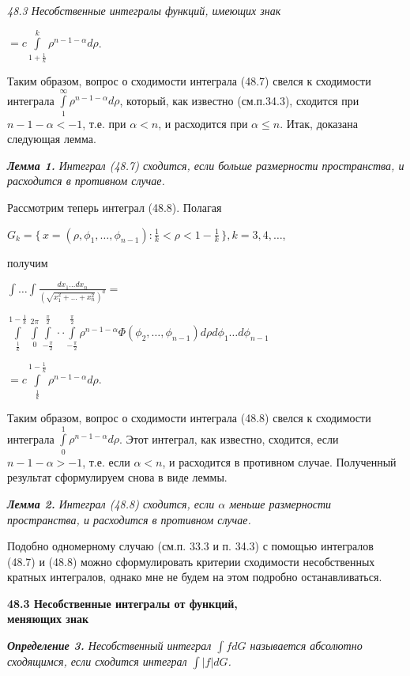 ﻿\documentclass[twocolumn,a4paper]{article}
\begin{document}
\newpage

{\slshape{48.3 Несобственные интегралы функций, имеющих знак}}
\begin{center}
$= c \int\limits^k_{1 + \frac1k} \rho^{n-1-\alpha}d\rho$.
\end{center}
Таким образом, вопрос о сходимости интеграла (48.7) свелся к сходимости интеграла $\int\limits_1^{\infty}\rho^{n-1-\alpha}d\rho$, который, как известно (см.п.34.3), сходится при $n - 1 - \alpha < -1$, т.е. при $\alpha < n$, и расходится при $\alpha\le n$. Итак, доказана следующая лемма.

{\slshape{{\bfseries{Лемма 1.}} Интеграл (48.7) сходится, если %
больше размерности пространства, и расходится в противном случае.}}

Рассмотрим теперь интеграл (48.8). Полагая
\begin{center}
$G_k = \{\,x = (\rho,\phi_1,\ldots,\phi_{n-1}):\frac1k < \rho < 1 - \frac1k\,\}, k = 3,4,\ldots$,
\end{center}
получим
\begin{center}
$\int \ldots \int\frac{dx_1\ldots dx_n}{(\sqrt{x^2_1+\ldots +x^2_n})^a} = $
\end{center}
\begin{center}
$\int\limits^{1-\frac1k}_{\frac1k}\int\limits_0^{2\pi}\int\limits_{-\frac{\pi}{2}}^{\frac{\pi}{2}}\cdot \cdot \int\limits_{-\frac{\pi}{2}}^{\frac{\pi}{2}}\rho^{n-1-\alpha}\Phi(\phi_2,\ldots,\phi_{n-1})d\rho d\phi_1\ldots d\phi_{n-1}$
\end{center}
\begin{center}
$= c \int\limits^{1-\frac1k}_{\frac1k} \rho^{n-1-\alpha}d\rho$.
\end{center}
Таким образом, вопрос о сходимости интеграла (48.8) свелся к сходимости интеграла $\int\limits_0^1 \rho^{n-1-\alpha}d\rho$. Этот интеграл, как известно, сходится, если $n - 1 - \alpha > -1$, т.е. если $\alpha < n$, и расходится в противном случае. Полученный результат сформулируем снова в виде леммы.

{\slshape{{\bfseries{Лемма 2.}} Интеграл (48.8) сходится, если $\alpha$
меньше размерности пространства, и расходится в противном случае.}}

Подобно одномерному случаю (см.п. 33.3 и п. 34.3) с помощью интегралов (48.7) и (48.8) можно сформулировать 
критерии сходимости несобственных кратных интегралов, однако мне не будем на этом подробно останавливаться.


\begin{flushleft}
{\bfseries  48.3 Несобственные интегралы от функций,\\
меняющих знак} %

{\slshape{\bf{Определение 3.}} Несобственный интеграл $\int fdG $ называется абсолютно сходящимся, если сходится интеграл $\int |f|dG $.}
\end{flushleft}
\end{document}
